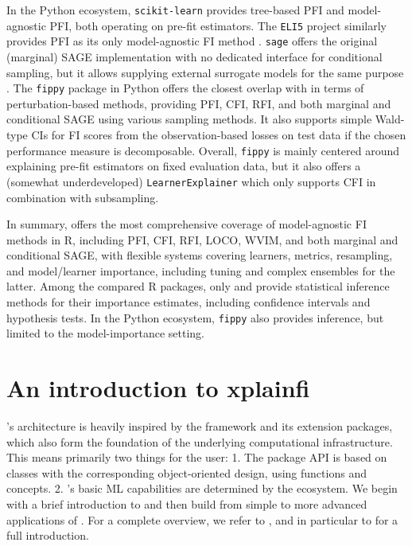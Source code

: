 In the Python ecosystem, \texttt{scikit-learn} provides tree-based PFI and model-agnostic PFI, both operating on pre-fit estimators.
The \texttt{ELI5} project similarly provides PFI as its only model-agnostic FI method \citep{eli5debug}.
\texttt{sage} offers the original (marginal) SAGE implementation with no dedicated interface for conditional sampling, but it allows supplying external surrogate models for the same purpose \citep{covert2020understandingglobalb, covert2021improvingkernelshap}.
The \texttt{fippy} package in Python offers the closest overlap with  in terms of perturbation-based methods, providing PFI, CFI, RFI, and both marginal and conditional SAGE using various sampling methods.
It also supports simple Wald-type CIs for FI scores from the observation-based losses on test data if the chosen performance measure is decomposable.
Overall, \texttt{fippy} is mainly centered around explaining pre-fit estimators on fixed evaluation data, but it also offers a (somewhat underdeveloped) \texttt{LearnerExplainer} which only supports CFI in combination with subsampling.

In summary,  offers the most comprehensive coverage of model-agnostic FI methods in R, including PFI, CFI, RFI, LOCO, WVIM, and both marginal and conditional SAGE, with flexible systems covering learners, metrics, resampling, and model/learner importance, including tuning and complex ensembles for the latter.
Among the compared R packages, only  and  provide statistical inference methods for their importance estimates,
including confidence intervals and hypothesis tests.
In the Python ecosystem, \texttt{fippy} also provides inference, but limited to the model-importance setting.

\section{An introduction to xplainfi}\label{sec-intro-xplainfi}

's architecture is heavily inspired by the  framework and its extension packages, which also form the foundation of the underlying computational infrastructure.
This means primarily two things for the user:
1. The package API is based on  classes with the corresponding object-oriented design, using  functions and concepts.
2. 's basic ML capabilities are determined by the  ecosystem.
We begin with a brief introduction to  and then build from simple to more advanced applications of .
For a complete overview, we refer to \citet{mlr3book}, and in particular to \citet{mlr3bookdatabasicmodeling} for a full introduction.

